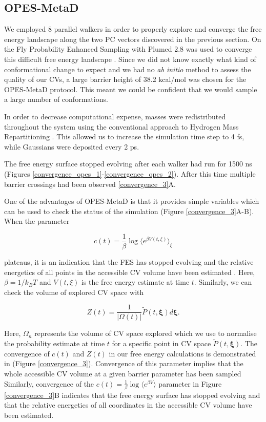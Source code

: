 \subsection{OPES-MetaD}
We employed 8 parallel walkers in order to properly explore and converge the free energy landscape along the two PC vectors discovered in the previous section. On the Fly Probability Enhanced Sampling with Plumed 2.8 was used to converge this difficult free energy landscape \cite{invernizzi2020, tribello2014}. Since we did not know exactly what kind of conformational change to expect and we had no \textit {ab initio} method to assess the quality of our CVs, a large barrier height of 38.2 kcal/mol was chosen for the OPES-MetaD protocol. This meant we could be confident that we would sample a large number of conformations. 

In order to decrease computational expense, masses were redistributed throughout the system using the conventional approach to Hydrogen Mass Repartitioning \cite{hopkins2015, balusek2019}. This allowed us to increase the simulation time step to 4 fs, while Gaussians were deposited every 2 ps.

The free energy surface stopped evolving after each walker had run for 1500 ns (Figures \ref{convergence_opes_1}-\ref{convergence_opes_2}). After this time multiple barrier crossings had been observed \ref{convergence_3}A.

One of the advantages of OPES-MetaD is that it provides simple variables which can be used to check the status of the simulation (Figure \ref{convergence_3}A-B). When the parameter 

\begin{equation}
	c(t) = \frac{1}{\beta} \log \langle e^{\beta V(t,\xi)} \rangle_\xi
\end{equation} 

plateaus, it is an indication that the FES has stopped evolving and the relative energetics of all points in the accessible CV volume have been estimated \cite{invernizzi2020, tiwary2015}. Here, $\beta=1/k_BT$ and $V(t,\xi)$ is the free energy estimate at time $t$. Similarly, we can check the volume of explored CV space with  

\begin{equation}
Z(t) = \frac{1}{| \Omega(t)|}  \tilde{P}(t, \mathbf{\xi}) d\mathbf{\xi}.
\end{equation} 

Here, $\Omega_n$ represents the volume of CV space explored which we use to normalise the probability estimate at time $t$ for a specific point in CV space $\tilde{P}(t, \mathbf{\xi})$. The convergence of $c(t)$ and $Z(t)$ in our free energy calculations is demonstrated in (Figure \ref{convergence_3}). Convergence of this parameter implies that the whole accessible CV volume at a given barrier parameter has been sampled Similarly, convergence of the $c(t) = \frac{1}{\beta} \log \langle e^{\beta V} \rangle$ parameter in Figure \ref{convergence_3}B indicates that the free energy surface has stopped evolving and that the relative energetics of all coordinates in the accessible CV volume have been estimated.  

